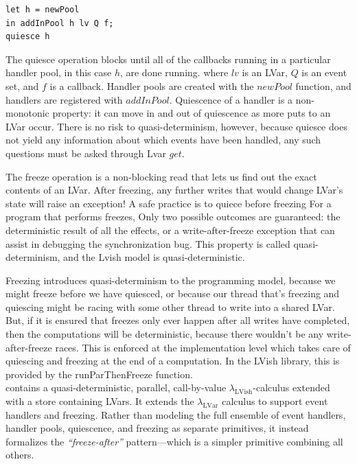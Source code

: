 \documentclass[twocolumn]{article}
\newcommand{\lambdaLVar}{\ensuremath{\lambda_{\textrm{LVar}}}}
\newcommand{\lambdaLVish}{\ensuremath{\lambda_{\textrm{LVish}}}}
\begin{document}
\begin{verbatim}
let h = newPool
in addInPool h lv Q f;
quiesce h
\end{verbatim}
The quiesce operation blocks until all of the callbacks running in a particular handler pool, in this case $h$, are done running. 
where $lv$ is an LVar, $Q$ is an event set, and $f$ is a callback. Handler pools are created with the $newPool$ function, and handlers are registered with $addInPool$. Quiescence of a handler is a non-monotonic property: it can move in and out of quiescence as more puts to an LVar occur. There is no risk to quasi-determinism, however, because quiesce does not yield any information about which events have been handled, any such questions must be asked through Lvar $get$. 

The freeze operation is a non-blocking read that lets us find out the exact contents of an LVar. After freezing, any further writes that would change LVar's state will raise an exception! A safe practice is to quiece before freezing For a program that performs freezes, Only two possible outcomes are guaranteed: the deterministic result of all the effects, or a write-after-freeze exception that can assist in debugging the synchronization bug. This property is called quasi-determinism, and the Lvish model is
quasi-deterministic.

Freezing introduces quasi-determinism to the programming model, because we might freeze before we have quiesced, or because our thread that's freezing and quiescing might be racing with some other thread to write into a shared LVar. But, if it is ensured that freezes only ever happen after all writes have completed, then the computations will be deterministic, because there wouldn't be any write-after-freeze races. This is enforced at the implementation level which takes care of quiescing and
freezing at the end of a computation. In the LVish library, this is provided by the runParThenFreeze function.\\
\cite{lkuper2}contains a quasi-deterministic, parallel, call-by-value $\lambdaLVish$-calculus extended with a store containing LVars. It extends the $\lambdaLVar$ calculus to support event handlers and freezing. Rather than modeling the full ensemble of event handlers, handler pools, quiescence, and freezing as separate primitives, it instead formalizes the \emph{“freeze-after”} pattern—which is a simpler primitive combining all others.
\end{document}
